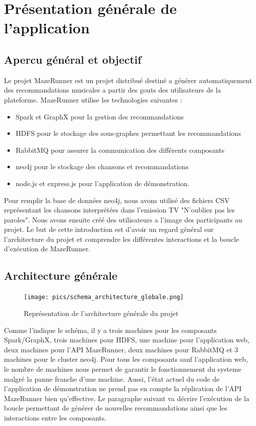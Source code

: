 \section{Présentation générale de l'application}

\subsection{Apercu général et objectif}

Le projet MazeRunner est un projet distribué destiné a générer automatiquement des recommandations musicales a partir des gouts des utilisateurs de la plateforme.
MazeRunner utilise les technologies suivantes :
\begin{itemize}
  \item Spark et GraphX pour la gestion des recommandations
  \item HDFS pour le stockage des sous-graphes permettant les recommandations
  \item RabbitMQ pour assurer la communication des différents composants
  \item neo4j pour le stockage des chansons et recommandations
  \item node.js et express.js pour l'application de démonstration.
\end{itemize}

Pour remplir la base de données neo4j, nous avons utilisé des fichiers CSV représentant les chansons interprétées dans l'emission TV "N'oubliez pas les paroles".
Nous avons ensuite créé des utilisateurs a l'image des participants au projet. Le but de cette introduction est d'avoir un regard général sur l'architecture du projet et comprendre les différentes interactions et la boucle d'exécution de MazeRunner.

\subsection{Architecture générale}

\begin{figure}
    \centering
    \texttt{[image: pics/schema\_architecture\_globale.png]}
    \caption{Représentation de l'architecture générale du projet}
\end{figure}

Comme l'indique le schéma, il y a trois machines pour les composants Spark/GraphX, trois machines pour HDFS, une machine pour l'application web, deux machines pour l'API MazeRunner, deux machines pour RabbitMQ et 3 machines pour le cluster neo4j.
Pour tous les composants sauf l'application web, le nombre de machines nous permet de garantir le fonctionnement du systeme malgré la panne franche d'une machine. Aussi, l'état actuel du code de l'application de démonstration ne prend pas en compte la réplication de l'API MazeRunner bien qu'effective.
Le paragraphe suivant va décrire l'exécution de la boucle permettant de générer de nouvelles recommandations ainsi que les interactions entre les composants.

